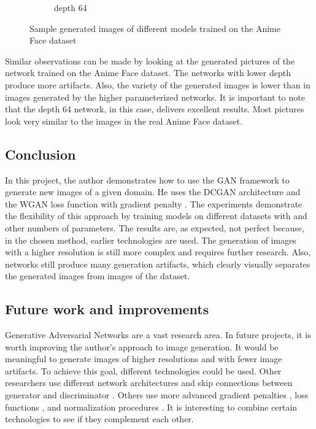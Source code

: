 \begin{figure}[H]
\begin{subfigure}[b]{0.24\textwidth}
        \caption{depth 64}
        \label{fig:anime_64}
    \end{subfigure}
    \caption{Sample generated images of different models trained on the Anime Face dataset}
    \label{fig:ouput_anime}
\end{figure}

Similar observations can be made by looking at the generated pictures of the network trained on the Anime Face dataset. The networks with lower depth produce more artifacts. Also, the variety of the generated images is lower than in images generated by the higher parameterized networks. It is important to note that the depth 64 network, in this case, delivers excellent results. Most pictures look very similar to the images in the real Anime Face dataset. 

\subsection{Conclusion}

In this project, the author demonstrates how to use the GAN \cite{goodfellow2014generative} framework to generate new images of a given domain. He uses the DCGAN \cite{radford2016dcgan} architecture and the WGAN \cite{arjovsky2017wgan} loss function with gradient penalty \cite{gulrajani2017wgangp}. The experiments demonstrate the flexibility of this approach by training models on different datasets with and other numbers of parameters. The results are, as expected, not perfect because, in the chosen method, earlier technologies are used. The generation of images with a higher resolution is still more complex and requires further research. Also, networks still produce many generation artifacts, which clearly visually separates the generated images from images of the dataset.

\newpage

\subsection{Future work and improvements}

Generative Adversarial Networks are a vast research area. In future projects, it is worth improving the author's approach to image generation.   It would be meaningful to generate images of higher resolutions and with fewer image artifacts. To achieve this goal, different technologies could be used.  Other researchers use different network architectures and skip connections between generator and discriminator \cite{karnewar2020msggan}. Others use more advanced gradient penalties \cite{dragan} \cite{wgandiv}, loss functions \cite{realness} \cite{jolicoeurmartineau2018rahinge}, and normalization procedures \cite{miyato2018spectral}. It is interesting to combine certain technologies to see if they complement each other. \\

